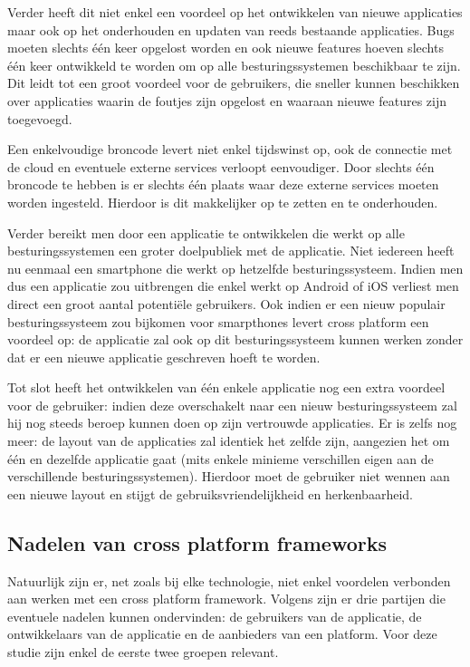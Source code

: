 Verder heeft dit niet enkel een voordeel op het ontwikkelen van nieuwe applicaties maar ook op het onderhouden en updaten van reeds bestaande applicaties. Bugs moeten slechts één keer opgelost worden en ook nieuwe features hoeven slechts één keer ontwikkeld te worden om op alle besturingssystemen beschikbaar te zijn. Dit leidt tot een groot voordeel voor de gebruikers, die sneller kunnen beschikken over applicaties waarin de foutjes zijn opgelost en waaraan nieuwe features zijn toegevoegd. 

Een enkelvoudige broncode levert niet enkel tijdswinst op, ook de connectie met de cloud en eventuele externe services verloopt eenvoudiger. Door slechts één broncode te hebben is er slechts één plaats waar deze externe services moeten worden ingesteld. Hierdoor is dit makkelijker op te zetten en te onderhouden.

Verder bereikt men door een applicatie te ontwikkelen die werkt op alle besturingssystemen een groter doelpubliek met de applicatie. Niet iedereen heeft nu eenmaal een smartphone die werkt op hetzelfde besturingssysteem. Indien men dus een applicatie zou uitbrengen die enkel werkt op Android of iOS verliest men direct een groot aantal potentiële gebruikers. Ook indien er een nieuw populair besturingssysteem zou bijkomen voor smarpthones levert cross platform een voordeel op: de applicatie zal ook op dit besturingssysteem kunnen werken zonder dat er een nieuwe applicatie geschreven hoeft te worden.

Tot slot heeft het ontwikkelen van één enkele applicatie nog een extra voordeel voor de gebruiker: indien deze overschakelt naar een nieuw besturingssysteem zal hij nog steeds beroep kunnen doen op zijn vertrouwde applicaties. Er is zelfs nog meer: de layout van de applicaties zal identiek het zelfde zijn, aangezien het om één en dezelfde applicatie gaat (mits enkele minieme verschillen eigen aan de verschillende besturingssystemen). Hierdoor moet de gebruiker niet wennen aan een nieuwe layout en stijgt de gebruiksvriendelijkheid en herkenbaarheid.

\subsection{Nadelen van cross platform frameworks}

Natuurlijk zijn er, net zoals bij elke technologie, niet enkel voordelen verbonden aan werken met een cross platform framework. Volgens \textcite{Corral2012} zijn er drie partijen die eventuele nadelen kunnen ondervinden: de gebruikers van de applicatie, de ontwikkelaars van de applicatie en de aanbieders van een platform. Voor deze studie zijn enkel de eerste twee groepen relevant.

